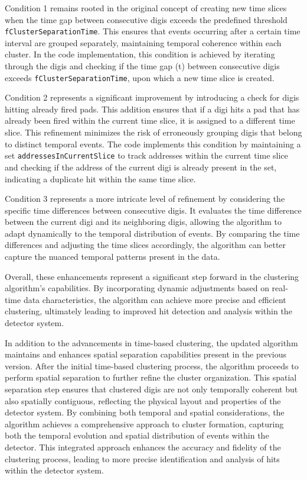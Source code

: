\documentclass{CBM-PR-2019}
\begin{document}
Condition 1 remains rooted in the original concept of creating new time slices when the time gap between consecutive digis exceeds the predefined threshold \texttt{fClusterSeparationTime}. This ensures that events occurring after a certain time interval are grouped separately, maintaining temporal coherence within each cluster. In the code implementation, this condition is achieved by iterating through the digis and checking if the time gap (t) between consecutive digis exceeds \texttt{fClusterSeparationTime}, upon which a new time slice is created.

Condition 2 represents a significant improvement by introducing a check for digis hitting already fired pads. This addition ensures that if a digi hits a pad that has already been fired within the current time slice, it is assigned to a different time slice. This refinement minimizes the risk of erroneously grouping digis that belong to distinct temporal events. The code implements this condition by maintaining a set \texttt{addressesInCurrentSlice} to track addresses within the current time slice and checking if the address of the current digi is already present in the set, indicating a duplicate hit within the same time slice.

Condition 3 represents a more intricate level of refinement by considering the specific time differences between consecutive digis. It evaluates the time difference between the current digi and its neighboring digis, allowing the algorithm to adapt dynamically to the temporal distribution of events. By comparing the time differences and adjusting the time slices accordingly, the algorithm can better capture the nuanced temporal patterns present in the data.

Overall, these enhancements represent a significant step forward in the clustering algorithm's capabilities. By incorporating dynamic adjustments based on real-time data characteristics, the algorithm can achieve more precise and efficient clustering, ultimately leading to improved hit detection and analysis within the detector system.


In addition to the advancements in time-based clustering, the updated algorithm maintains and enhances spatial separation capabilities present in the previous version. After the initial time-based clustering process, the algorithm proceeds to perform spatial separation to further refine the cluster organization. This spatial separation step ensures that clustered digis are not only temporally coherent but also spatially contiguous, reflecting the physical layout and properties of the detector system. By combining both temporal and spatial considerations, the algorithm achieves a comprehensive approach to cluster formation, capturing both the temporal evolution and spatial distribution of events within the detector. This integrated approach enhances the accuracy and fidelity of the clustering process, leading to more precise identification and analysis of hits within the detector system.
\end{document}
